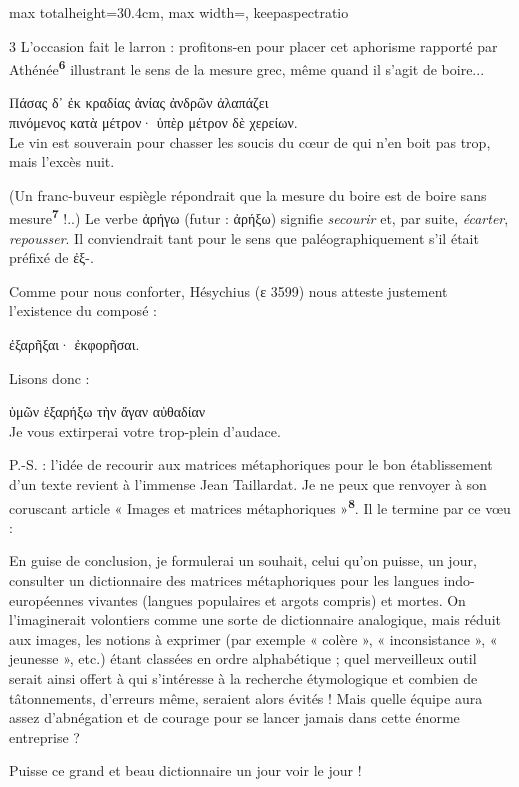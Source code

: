 \documentclass[11pt,twoside]{book}
\newcommand{\italique}[1]{\textit{#1}}
\newcommand{\citComm}[1]{\begin{quoting}[vskip=0.4pt,leftmargin=0.7em,rightmargin=0.2em]#1\end{quoting}}
\newcommand{\francais}[1]{{\policeFr #1}}
\newcommand{\marqueur}[1]{\textsuperscript{\color{rubricRed}\textbf{#1}}}
\begin{document}
\begin{adjustbox}{max totalheight=30.4cm, max width=\textwidth, keepaspectratio}
\begin{minipage}{\textwidth}
{\begin{multicols}{3}
\noindent L'occasion fait le larron : profitons-en pour placer cet aphorisme rapporté par Athénée\marqueur{6} illustrant le sens de la mesure grec, même quand il s'agit de boire...
\citComm{Πάσας δ᾽ ἐκ κραδίας ἀνίας ἀνδρῶν ἀλαπάζει\\
πινόμενος κατὰ μέτρον· ὑπὲρ μέτρον δὲ χερείων.\\
\francais{Le vin est souverain pour chasser les soucis du cœur de qui n'en boit pas trop, mais l'excès nuit.}}
\par\vspace{1.5pt}
\noindent (Un franc-buveur espiègle répondrait que la mesure du boire est de boire sans mesure\marqueur{7} !..) Le verbe ἀρήγω (futur : ἀρήξω) signifie \italique{secourir} et, par suite, \italique{écarter}, \italique{repousser}. Il conviendrait tant pour le sens que paléographiquement s'il était préfixé de ἐξ-.
\par\vspace{1.5pt}
\noindent Comme pour nous conforter, Hésychius (ε 3599) nous atteste justement l'existence du composé :
\citComm{ἐξαρῆξαι· ἐκφορῆσαι.}
\par\vspace{1.5pt}
\noindent Lisons donc :
\citComm{ὑμῶν ἐξαρήξω τὴν ἄγαν αὐθαδίαν\\
Je vous extirperai votre trop-plein d'audace.}
\par\vspace{1.5pt}
\noindent P.-S. : l'idée de recourir aux matrices métaphoriques pour le bon établissement d'un texte revient à l'immense Jean Taillardat. Je ne peux que renvoyer à son coruscant article « Images et matrices métaphoriques »\marqueur{8}. Il le termine par ce vœu :
\citComm{En guise de conclusion, je formulerai un souhait, celui qu'on puisse, un jour, consulter un dictionnaire des matrices métaphoriques pour les langues indo-européennes vivantes (langues populaires et argots compris) et mortes. On l'imaginerait volontiers comme une sorte de dictionnaire analogique, mais réduit aux images, les notions à exprimer (par exemple « colère », « inconsistance », « jeunesse », etc.) étant classées en ordre alphabétique ; quel merveilleux outil serait ainsi offert à qui s'intéresse à la recherche étymologique et combien de tâtonnements, d'erreurs même, seraient alors évités ! Mais quelle équipe aura assez d'abnégation et de courage pour se lancer jamais dans cette énorme entreprise ?}
\par\vspace{1.5pt}
\noindent Puisse ce grand et beau dictionnaire un jour voir le jour !

\end{multicols}}
\end{minipage}
\end{adjustbox}
\end{document}
